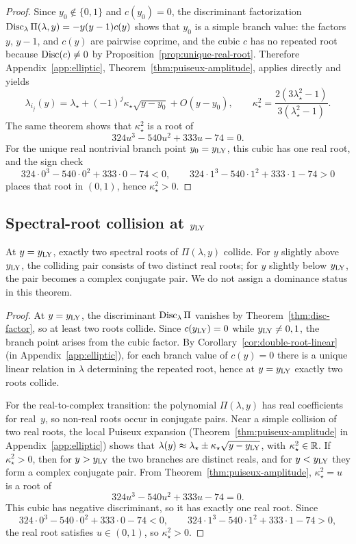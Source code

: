 \begin{proof}
Since \(y_0\notin\{0,1\}\) and \(c(y_0)=0\), the discriminant factorization
\(\operatorname{Disc}_\lambda\Pi(\lambda,y)=-y(y-1)c(y)\) shows that \(y_0\) is a simple branch value:
the factors \(y\), \(y-1\), and \(c(y)\) are pairwise coprime, and the cubic \(c\) has no repeated root because \(\operatorname{Disc}(c)\neq 0\) by Proposition~\ref{prop:unique-real-root}.
Therefore Appendix~\ref{app:elliptic}, Theorem~\ref{thm:puiseux-amplitude}, applies directly and yields
\[
\lambda_{i_j}(y)=\lambda_\star+(-1)^j\kappa_\star\sqrt{y-y_0}+O(y-y_0),
\qquad
\kappa_\star^2=\frac{2(3\lambda_\star^2-1)}{3(\lambda_\star^2-1)}.
\]
The same theorem shows that \(\kappa_\star^2\) is a root of
\[
324u^3-540u^2+333u-74=0.
\]
For the unique real nontrivial branch point \(y_0=y_{\mathrm{LY}}\), this cubic has one real root, and the sign check
\[
324\cdot 0^3-540\cdot 0^2+333\cdot 0-74<0,\qquad
324\cdot 1^3-540\cdot 1^2+333\cdot 1-74>0
\]
places that root in \((0,1)\), hence \(\kappa_\star^2>0\).
\end{proof}

\subsection{Spectral-root collision at \texorpdfstring{$y_{\mathrm{LY}}$}{y\_LY}}

\begin{proposition}\label{prop:yLY-collision}
At $y=y_{\mathrm{LY}}$, exactly two spectral roots of $\Pi(\lambda,y)$ collide.
For $y$ slightly above $y_{\mathrm{LY}}$, the colliding pair consists of two distinct real roots; for $y$ slightly below $y_{\mathrm{LY}}$, the pair becomes a complex conjugate pair.
We do not assign a dominance status in this theorem.
\end{proposition}

\begin{proof}
At $y=y_{\mathrm{LY}}$, the discriminant $\operatorname{Disc}_\lambda\Pi$ vanishes by Theorem~\ref{thm:disc-factor}, so at least two roots collide.
Since $c(y_{\mathrm{LY}})=0$ while $y_{\mathrm{LY}}\neq 0,1$, the branch point arises from the cubic factor.
By Corollary~\ref{cor:double-root-linear} (in Appendix~\ref{app:elliptic}), for each branch value of $c(y)=0$ there is a unique linear relation in $\lambda$ determining the repeated root, hence at $y=y_{\mathrm{LY}}$ exactly two roots collide.

For the real-to-complex transition: the polynomial $\Pi(\lambda,y)$ has real coefficients for real~$y$, so non-real roots occur in conjugate pairs.
Near a simple collision of two real roots, the local Puiseux expansion (Theorem~\ref{thm:puiseux-amplitude} in Appendix~\ref{app:elliptic}) shows that
$\lambda(y)\approx \lambda_\star\pm \kappa_\star\sqrt{y-y_{\mathrm{LY}}}$,
with $\kappa_\star^2\in\mathbb{R}$.
If $\kappa_\star^2>0$, then for $y>y_{\mathrm{LY}}$ the two branches are distinct reals, and for $y<y_{\mathrm{LY}}$ they form a complex conjugate pair.
From Theorem~\ref{thm:puiseux-amplitude}, $\kappa_\star^2=u$ is a root of
\[
324u^3-540u^2+333u-74=0.
\]
This cubic has negative discriminant, so it has exactly one real root. Since
\[
324\cdot 0^3-540\cdot 0^2+333\cdot 0-74<0,\qquad
324\cdot 1^3-540\cdot 1^2+333\cdot 1-74>0,
\]
the real root satisfies $u\in(0,1)$, so $\kappa_\star^2>0$.

\end{proof}


